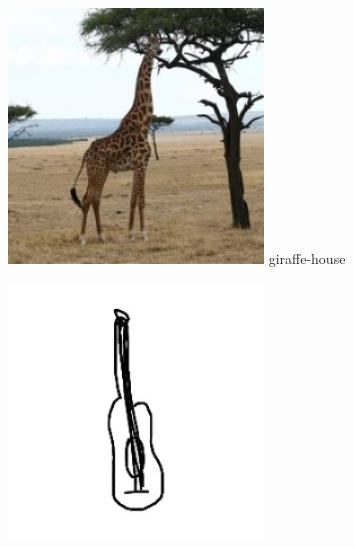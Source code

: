 \documentclass{article}
\begin{document}
\begin{center}
    \noindent
    \begin{minipage}{0.142\textwidth}
        \includegraphics[width=\linewidth]{./pic/misclassified_r2_p5_2723.jpg}
        giraffe-house
    \end{minipage}%
    \begin{minipage}{0.142\textwidth}
        \includegraphics[width=\linewidth]{./pic/misclassified_r3_p0_2723.jpg}

\end{minipage}
\end{center}
\end{document}
